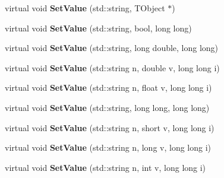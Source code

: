 \begin{DoxyCompactItemize}
\item 
\hypertarget{class_h_a_l_1_1_analysis_data_a2898f0cdfdf793b28441208ccdfcd6cc}{virtual void {\bfseries Set\-Value} (std\-::string, T\-Object $\ast$)}\label{class_h_a_l_1_1_analysis_data_a2898f0cdfdf793b28441208ccdfcd6cc}

\item 
\hypertarget{class_h_a_l_1_1_analysis_data_a918f900e8140136fcae7b80a6213da3a}{virtual void {\bfseries Set\-Value} (std\-::string, bool, long long)}\label{class_h_a_l_1_1_analysis_data_a918f900e8140136fcae7b80a6213da3a}

\item 
\hypertarget{class_h_a_l_1_1_analysis_data_aeea92a639549a7116d36befd0cc0c9eb}{virtual void {\bfseries Set\-Value} (std\-::string, long double, long long)}\label{class_h_a_l_1_1_analysis_data_aeea92a639549a7116d36befd0cc0c9eb}

\item 
\hypertarget{class_h_a_l_1_1_analysis_data_a054caa1cdd0fb81390261d3814f314bc}{virtual void {\bfseries Set\-Value} (std\-::string n, double v, long long i)}\label{class_h_a_l_1_1_analysis_data_a054caa1cdd0fb81390261d3814f314bc}

\item 
\hypertarget{class_h_a_l_1_1_analysis_data_acc40a29202ae94df64e488d2096da0f6}{virtual void {\bfseries Set\-Value} (std\-::string n, float v, long long i)}\label{class_h_a_l_1_1_analysis_data_acc40a29202ae94df64e488d2096da0f6}

\item 
\hypertarget{class_h_a_l_1_1_analysis_data_ae6b7547af48827714bc29f286eb89d28}{virtual void {\bfseries Set\-Value} (std\-::string, long long, long long)}\label{class_h_a_l_1_1_analysis_data_ae6b7547af48827714bc29f286eb89d28}

\item 
\hypertarget{class_h_a_l_1_1_analysis_data_a6dd3d8b36479126e96b7b61d8b6fe3f2}{virtual void {\bfseries Set\-Value} (std\-::string n, short v, long long i)}\label{class_h_a_l_1_1_analysis_data_a6dd3d8b36479126e96b7b61d8b6fe3f2}

\item 
\hypertarget{class_h_a_l_1_1_analysis_data_a2444500aaf3347414fffdbf09e57bd50}{virtual void {\bfseries Set\-Value} (std\-::string n, long v, long long i)}\label{class_h_a_l_1_1_analysis_data_a2444500aaf3347414fffdbf09e57bd50}

\item 
\hypertarget{class_h_a_l_1_1_analysis_data_a7ee493b86bc29e0769bf395d53254016}{virtual void {\bfseries Set\-Value} (std\-::string n, int v, long long i)}\label{class_h_a_l_1_1_analysis_data_a7ee493b86bc29e0769bf395d53254016}


\end{DoxyCompactItemize}
